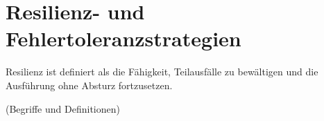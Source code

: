 \section{Resilienz- und Fehlertoleranzstrategien}

Resilienz ist definiert als die Fähigkeit, Teilausfälle zu bewältigen und die Ausführung ohne Absturz fortzusetzen.

(Begriffe und Definitionen)
